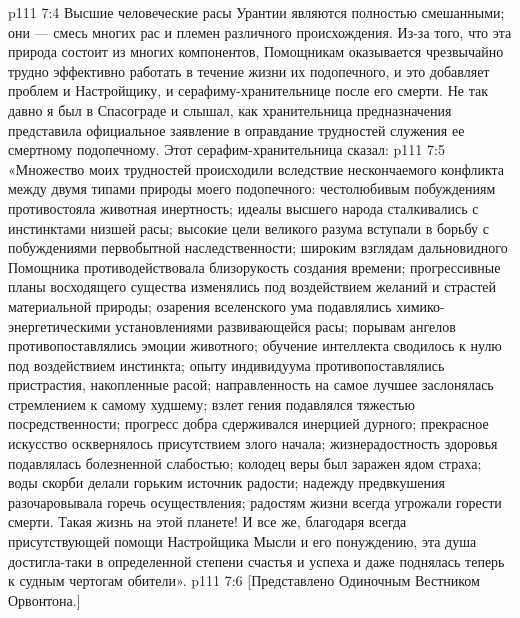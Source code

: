 \vs p111 7:4 Высшие человеческие расы Урантии являются полностью смешанными; они --- смесь многих рас и племен различного происхождения. Из\hyp{}за того, что эта природа состоит из многих компонентов, Помощникам оказывается чрезвычайно трудно эффективно работать в течение жизни их подопечного, и это добавляет проблем и Настройщику, и серафиму\hyp{}хранительнице после его смерти. Не так давно я был в Спасограде и слышал, как хранительница предназначения представила официальное заявление в оправдание трудностей служения ее смертному подопечному. Этот серафим\hyp{}хранительница сказал:
\vs p111 7:5 \pc «Множество моих трудностей происходили вследствие нескончаемого конфликта между двумя типами природы моего подопечного: честолюбивым побуждениям противостояла животная инертность; идеалы высшего народа сталкивались с инстинктами низшей расы; высокие цели великого разума вступали в борьбу с побуждениями первобытной наследственности; широким взглядам дальновидного Помощника противодействовала близорукость создания времени; прогрессивные планы восходящего существа изменялись под воздействием желаний и страстей материальной природы; озарения вселенского ума подавлялись химико\hyp{}энергетическими установлениями развивающейся расы; порывам ангелов противопоставлялись эмоции животного; обучение интеллекта сводилось к нулю под воздействием инстинкта; опыту индивидуума противопоставлялись пристрастия, накопленные расой; направленность на самое лучшее заслонялась стремлением к самому худшему; взлет гения подавлялся тяжестью посредственности; прогресс добра сдерживался инерцией дурного; прекрасное искусство осквернялось присутствием злого начала; жизнерадостность здоровья подавлялась болезненной слабостью; колодец веры был заражен ядом страха; воды скорби делали горьким источник радости; надежду предвкушения разочаровывала горечь осуществления; радостям жизни всегда угрожали горести смерти. Такая жизнь на этой планете! И все же, благодаря всегда присутствующей помощи Настройщика Мысли и его понуждению, эта душа достигла\hyp{}таки в определенной степени счастья и успеха и даже поднялась теперь к судным чертогам обители».
\vsetoff
\vs p111 7:6 [Представлено Одиночным Вестником Орвонтона.]
